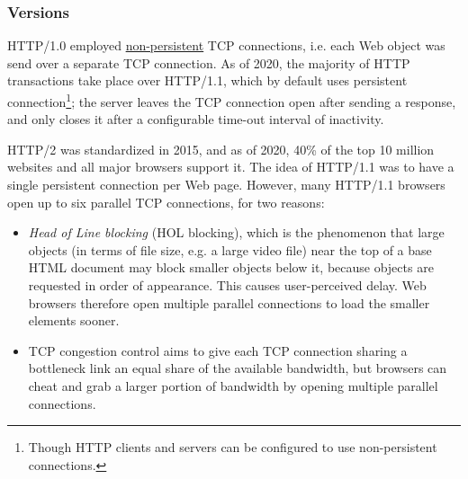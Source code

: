 \documentclass[8pt, table, xcdraw]{article}%
\begin{document}
\subsubsection{Versions}

HTTP/1.0 employed \hyperref[ch:transport:tcp]{non-persistent} TCP connections, i.e. each Web object was send over a separate TCP connection. As of 2020, the majority of HTTP transactions take place over HTTP/1.1, which by default uses persistent connection\footnote{Though HTTP clients and servers can be configured to use non-persistent connections.}; the server leaves the TCP connection open after sending a response, and only closes it after a configurable time-out interval of inactivity.

HTTP/2 was standardized in 2015, and as of 2020, 40\% of the top 10 million websites and all major browsers support it. The idea of HTTP/1.1 was to have a single persistent connection per Web page. However, many HTTP/1.1 browsers open up to six parallel TCP connections, for two reasons:

\begin{itemize}
	\item \emph{Head of Line blocking} (HOL blocking), which is the phenomenon that large objects (in terms of file size, e.g. a large video file) near the top of a base HTML document may block smaller objects below it, because objects are requested in order of appearance. This causes user-perceived delay. Web browsers therefore open multiple parallel connections to load the smaller elements sooner.
	\item TCP congestion control aims to give each TCP connection sharing a bottleneck link an equal share of the available bandwidth, but browsers can cheat and grab a larger portion of bandwidth by opening multiple parallel connections.
\end{itemize}
\end{document}
